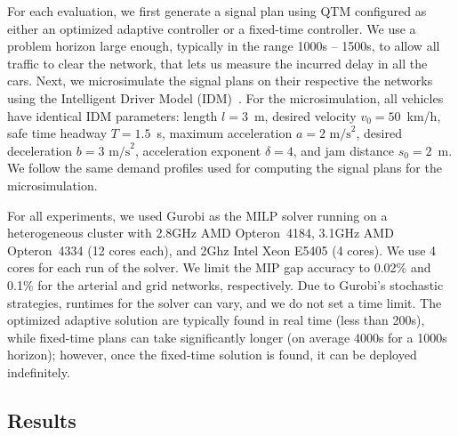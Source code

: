 For each evaluation, we first generate a signal plan using QTM configured as
either an optimized adaptive controller or a fixed-time controller.
%
We use a problem horizon \TMAX large enough, typically in the range 1000s --
1500s, to allow all traffic to clear the network, that lets us measure the
incurred delay in all the cars.
%
Next, we microsimulate the signal plans on their respective the networks using
the Intelligent Driver Model (IDM)~\cite{treiber2000congested}.
%
For the microsimulation, all vehicles have identical IDM parameters: length
$l=3$~m, desired velocity $v_0 = 50$~km/h, safe time headway $T=1.5$~s, maximum
acceleration $a=2 \text{ m/s}^2$, desired deceleration $b = 3 \text{ m/s}^2$,
acceleration exponent $\delta = 4$, and jam distance $s_0 = 2$~m.
%
We follow the same demand profiles used for computing the signal plans for the
microsimulation.


For all experiments, we used Gurobi as the MILP solver running on a
heterogeneous cluster with 2.8GHz AMD Opteron~4184, 3.1GHz AMD Opteron~4334 (12
cores each), and 2Ghz Intel Xeon E5405 (4 cores). We use 4 cores for each run of
the solver.
%
We limit the MIP gap accuracy to 0.02\% and 0.1\% for the arterial and grid
networks, respectively.
%
Due to Gurobi's stochastic strategies, runtimes for the solver can vary, and we
do not set a time limit.
%
The optimized adaptive solution are typically found in real time (less than
200s), while fixed-time plans can take significantly longer (on average 4000s
for a 1000s horizon); however, once the fixed-time solution is found, it can be
deployed indefinitely.
%




\subsection{Results}



